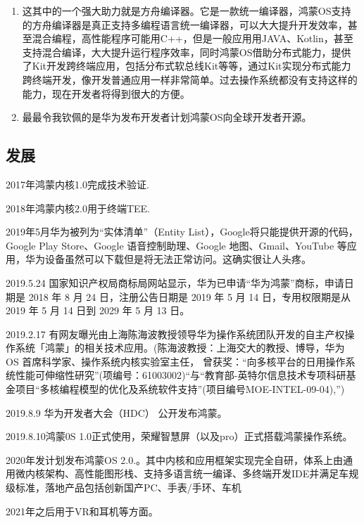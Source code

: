 \documentclass{article}
\begin{document}
\begin{enumerate}
    \item {这其中的一个强大助力就是方舟编译器。它是一款统一编译器，鸿蒙OS支持的方舟编译器是真正支持多编程语言统一编译器，可以大大提升开发效率，甚至混合编程，高性能程序可能用C++，但是一般应用用JAVA、Kotlin，甚至支持混合编译，大大提升运行程序效率，同时鸿蒙OS借助分布式能力，提供了Kit开发跨终端应用，包括分布式软总线Kit等等，通过Kit实现分布式能力跨终端开发，像开发普通应用一样非常简单。过去操作系统都没有支持这样的能力，现在开发者将得到很大的方便。}
    \item {最最令我钦佩的是华为发布开发者计划鸿蒙OS向全球开发者开源。}
\end{enumerate}
\subsection{发展}
2017年鸿蒙内核1.0完成技术验证.\par
2018年鸿蒙内核2.0用于终端TEE.\par
2019年5月华为被列为“实体清单”（Entity List），Google将只能提供开源的代码， Google Play Store、Google 语音控制助理、Google 地图、Gmail、YouTube 等应用，华为设备虽然可以下载但是将无法正常访问。这确实很让人头疼。\par
2019.5.24 国家知识产权局商标局网站显示，华为已申请“华为鸿蒙”商标，申请日期是 2018 年 8 月 24 日，注册公告日期是 2019 年 5 月 14 日，专用权限期是从 2019 年 5 月 14 日到 2029 年 5 月 13 日。\par 
2019.2.17 有网友曝光由上海陈海波教授领导华为操作系统团队开发的自主产权操作系统「鸿蒙」的相关技术应用。(陈海波教授：上海交大的教授、博导，华为 OS 首席科学家、操作系统内核实验室主任， 曾获奖：“向多核平台的日用操作系统性能可伸缩性研究”(项编号：61003002)“与“教育部-英特尔信息技术专项科研基金项目“多核编程模型的优化及系统软件支持”(项目编号MOE-INTEL-09-04),”) \cite{ref4} \par
2019.8.9 华为开发者大会（HDC） 公开发布鸿蒙。\par
2019.8.10鸿蒙0S 1.0正式使用，荣耀智慧屏（以及pro）正式搭载鸿蒙操作系统。\par 
2020年发计划发布鸿蒙OS 2.0.。其中内核和应用框架实现完全自研，体系上由通用微内核架构、高性能图形栈、支持多语言统一编译、多终端开发IDE并满足车规级标准，落地产品包括创新国产PC、手表/手环、车机\par
2021年之后用于VR和耳机等方面。\par 
\end{document}
